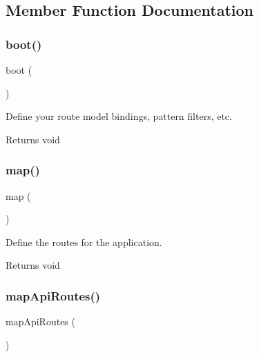 \subsection{Member Function Documentation}
\mbox{\label{class_app_1_1_providers_1_1_route_service_provider_a8814ea4b5beba763c570b4818980814e}} 
\subsubsection{\texorpdfstring{boot()}{boot()}}
{\footnotesize\ttfamily boot (\begin{DoxyParamCaption}{ }\end{DoxyParamCaption})}

Define your route model bindings, pattern filters, etc.

\begin{DoxyReturn}{Returns}
void 
\end{DoxyReturn}
\mbox{\label{class_app_1_1_providers_1_1_route_service_provider_a7f35c814c022f4191d359b5dc139d35b}} 
\subsubsection{\texorpdfstring{map()}{map()}}
{\footnotesize\ttfamily map (\begin{DoxyParamCaption}{ }\end{DoxyParamCaption})}

Define the routes for the application.

\begin{DoxyReturn}{Returns}
void 
\end{DoxyReturn}
\mbox{\label{class_app_1_1_providers_1_1_route_service_provider_ad400e7ca0cea76b9680eeb68b55ea0e0}} 
\subsubsection{\texorpdfstring{mapApiRoutes()}{mapApiRoutes()}}
{\footnotesize\ttfamily map\+Api\+Routes (\begin{DoxyParamCaption}{ }\end{DoxyParamCaption})\hspace{0.3cm}{\ttfamily [protected]}}

